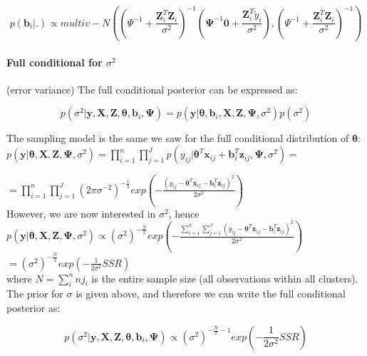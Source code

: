 \documentclass[a4paper]{article}
\begin{document}
\begin{equation}
	p(\bm{b}_{i}|.) 	\propto 	multiv-N((\Psi^{-1} + \frac{\bm{Z}_{i}^{T}\bm{Z}_{i}}{\sigma^2})^{-1}(\bm{\Psi}^{-1}\bm{0}+\frac{\bm{Z}_{i}^{T}\tilde{y}_{i}}{\sigma^2}), (\Psi^{-1} + \frac{\bm{Z}_{i}^{T}\bm{Z}_{i}}{\sigma^2})^{-1})	
\end{equation}


\paragraph{Full conditional for $\sigma^2$}(error variance)
The full conditional posterior can be expressed as:

\begin{equation}
	p(\sigma^2|\bm{y}, \bm{X}, \bm{Z}, \bm{\theta}, \bm{b}_{i}, \bm{\Psi}) = 	p(\bm{y}|\bm{\theta}, \bm{b}_{i}, \bm{X}, \bm{Z}, \bm{\Psi}, \sigma^2) p(\sigma^2)
\end{equation}

The sampling model is the same we saw for the full conditional distribution of $\bm{\theta}$:\\

$p(\bm{y}|\bm{\theta}, \bm{X}, \bm{Z}, \bm{\Psi}, \sigma^2) = \prod_{i=1}^n \prod_{j=1}^Jp(y_{ij}|\bm{\theta}^{T}\bm{x}_{ij} + \bm{b}_{i}^{T}\bm{z}_{ij}, \bm{\Psi}, \sigma^2)=$

$ = \prod_{i=1}^{n} \prod_{j=1}^{J}(2\pi\sigma^{-2})^{-\frac{1}{2}}exp(-\frac{(y_{ij} - \bm{\theta}^{T}\bm{x}_{ij} - \bm{b}_{i}^{T}\bm{z}_{ij})^2}{2\sigma^2})$\\

However, we are now interested in $\sigma^2$, hence\\

$p(\bm{y}|\bm{\theta}, \bm{X}, \bm{Z}, \bm{\Psi}, \sigma^2) \propto (\sigma^{2})^{-\frac{N}{2}}exp(-\frac{\sum_{i = 1}^{n}\sum_{j = 1}^{J}( y_{ij}-\bm{\theta}^{T}\bm{x}_{ij} - \bm{b}_{i}^{T}\bm{z}_{ij})^2 }{2\sigma^2})$
$=(\sigma^{2})^{-\frac{N}{2}}exp(-\frac{1}{2\sigma^2}SSR)$ \\

where $N = \sum_{i}^{n}nj_{i}$ is the entire sample size (all observations within all clusters).\\

The prior for $\sigma$ is given above, and therefore we can write the full conditional posterior as:

\begin{equation}
	p(\sigma^2|\bm{y}, \bm{X}, \bm{Z}, \bm{\theta}, \bm{b}_{i}, \bm{\Psi}) \propto (\sigma^{2})^{-\frac{N}{2}-1}exp(-\frac{1}{2\sigma^2}SSR)
\end{equation}
\end{document}
